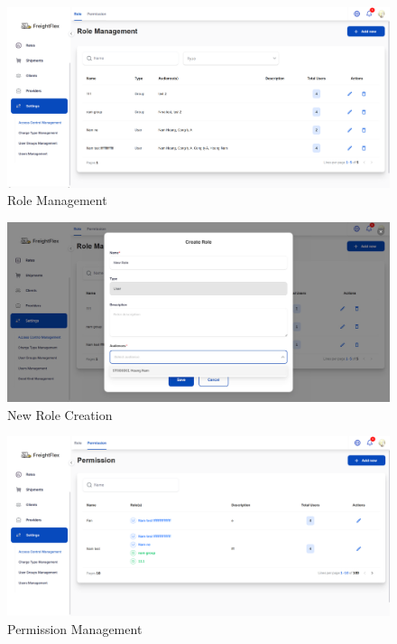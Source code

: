 \begin{figure}[H]
    \centering
    \includegraphics[width=15cm]{graphics/UI/role-management.png}
    \caption{Role Management}
    \label{fig:role-management}
\end{figure}

\begin{figure}[H]
    \centering
    \includegraphics[width=15cm]{graphics/UI/new-role.png}
    \caption{New Role Creation}
    \label{fig:new-role}
\end{figure}

\begin{figure}[H]
    \centering
    \includegraphics[width=15cm]{graphics/UI/permission-management.png}
    \caption{Permission Management}
    \label{fig:permission-management}
\end{figure}

